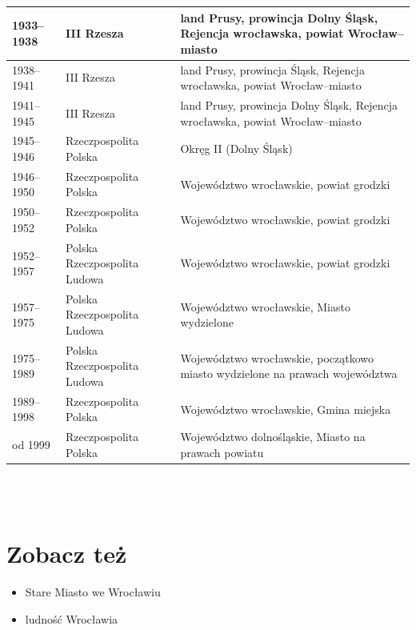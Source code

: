 \documentclass{article}
\begin{document}
\newpage
\begin{tabular}{ |p{2cm}|p{5cm}|p{5cm}| }
 \hline
1933–1938 & III Rzesza & land Prusy, prowincja Dolny Śląsk, Rejencja wrocławska, powiat Wrocław–miasto\\
\hline
1938–1941 & III Rzesza & land Prusy, prowincja Śląsk, Rejencja wrocławska, powiat Wrocław–miasto\\
\hline
1941–1945 & III Rzesza & land Prusy, prowincja Dolny Śląsk, Rejencja wrocławska, powiat Wrocław–miasto\\
\hline
1945–1946 & Rzeczpospolita Polska & Okręg II (Dolny Śląsk)\\
\hline
1946–1950 & Rzeczpospolita Polska & Województwo wrocławskie, powiat grodzki\\
\hline
1950–1952 & Rzeczpospolita Polska & Województwo wrocławskie, powiat grodzki\\
\hline
1952–1957 & Polska Rzeczpospolita Ludowa & Województwo wrocławskie, powiat grodzki\\
\hline
1957–1975 & Polska Rzeczpospolita Ludowa & Województwo wrocławskie, Miasto wydzielone\\
\hline
1975–1989 & Polska Rzeczpospolita Ludowa & Województwo wrocławskie, początkowo miasto wydzielone na prawach województwa\\
\hline
1989–1998 & Rzeczpospolita Polska & Województwo wrocławskie, Gmina miejska\\
\hline
od 1999 & Rzeczpospolita Polska & Województwo dolnośląskie, Miasto na prawach powiatu\\

 \hline
\end{tabular}\\\\











\section{Zobacz też}
\begin{itemize}
  \item Stare Miasto we Wrocławiu
  \item ludność Wrocławia 
\end{itemize}
\vspace{3mm}\newline 
\end{document}
